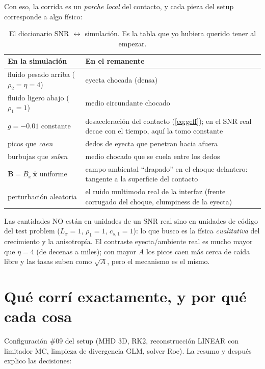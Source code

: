 \documentclass[11pt,a4paper]{article}
\begin{document}
Con eso, la corrida es un \emph{parche local} del contacto, y cada pieza del setup
corresponde a algo físico:

\begin{table}[H]
\centering\small
\caption{El diccionario SNR $\leftrightarrow$ simulación. Es la tabla que yo hubiera
querido tener al empezar.}
\begin{tabular}{@{}p{5.4cm}p{9.9cm}@{}}
\toprule
En la simulación & En el remanente \\
\midrule
fluido pesado arriba ($\rho_2=\eta=4$) & eyecta chocada (densa) \\
fluido ligero abajo ($\rho_1=1$) & medio circundante chocado \\
$g=-0.01$ constante & desaceleración del contacto (\ref{eq:geff}); en el SNR real decae
con el tiempo, aquí la tomo constante \\
picos que \emph{caen} & dedos de eyecta que penetran hacia afuera \\
burbujas que \emph{suben} & medio chocado que se cuela entre los dedos \\
$\mathbf{B}=B_x\,\hat{\mathbf{x}}$ uniforme & campo ambiental ``drapado'' en el choque
delantero: tangente a la superficie del contacto \\
perturbación aleatoria & el ruido multimodo real de la interfaz (frente corrugado del
choque, clumpiness de la eyecta) \\
\bottomrule
\end{tabular}
\end{table}

Las cantidades NO están en unidades de un SNR real sino en unidades de código del test
problem ($L_x=1$, $\rho_1=1$, $c_{s,1}=1$): lo que busco es la física \emph{cualitativa}
del crecimiento y la anisotropía. El contraste eyecta/ambiente real es mucho mayor que
$\eta=4$ (de decenas a miles); con mayor $A$ los picos caen más cerca de caída libre y
las tasas suben como $\sqrt{A}$, pero el mecanismo es el mismo.

\section{Qué corrí exactamente, y por qué cada cosa}

Configuración \#09 del setup (MHD 3D, RK2, reconstrucción LINEAR con limitador MC,
limpieza de divergencia GLM, solver Roe). La resumo y después explico las decisiones:
\end{document}
